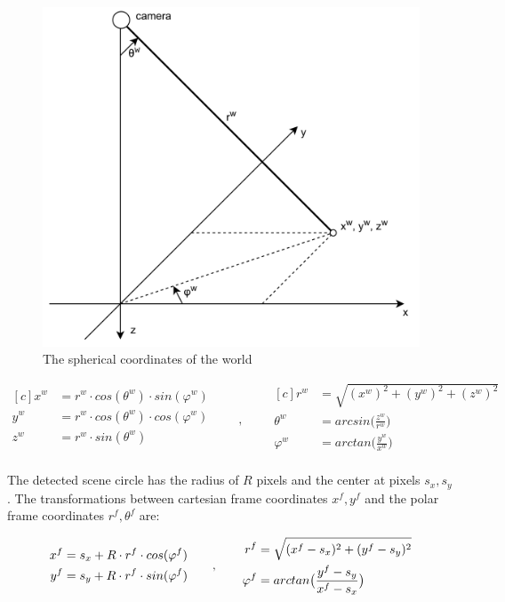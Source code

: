 \documentclass[a4paper,12pt,titlepage]{article}
\numberwithin{figure}{section}
\begin{document}
\begin{figure}[h]
\centering
\includegraphics[width=1\linewidth]{fig/sphere.png}
\caption{The spherical coordinates of the world}
\label{fig:sphere}
\end{figure}


\begin{equation*}
\begin{aligned}[c]
x^w &= r^w \cdot cos(\theta^w) \cdot sin(\varphi^w) \\
y^w &= r^w \cdot cos(\theta^w) \cdot cos(\varphi^w) \\
z^w &= r^w \cdot sin(\theta^w) \\
\end{aligned}
\qquad,\qquad
\begin{aligned}[c]
r^w &= \sqrt{(x^w)^2 + (y^w)^2 + (z^w)^2} \\
\theta^w &= arcsin\Big(\frac{z^w}{r^w}\Big) \\
\varphi^w &= arctan\Big(\frac{y^w}{x^w}\Big) \\
\end{aligned}
\end{equation*}



The detected scene circle has the radius of $R$ pixels and the center at pixels $s_x, s_y$. The transformations between cartesian frame coordinates $x^f, y^f$ and the polar frame coordinates $r^f, \theta^f$ are:

\begin{equation*}
\begin{aligned}[c]
x^f &= s_x + R \cdot r^f \cdot cos(\varphi^f) \\
y^f &= s_y + R \cdot r^f \cdot sin(\varphi^f) \\
\end{aligned}
\qquad,\qquad
\begin{aligned}[c]
r^f &= \sqrt{(x^f - s_x)^2 + (y^f - s_y)^2} \\
\varphi^f &= arctan\big{(}\frac{y^f - s_y}{x^f - s_x}\big{)}
\end{aligned}
\end{equation*}
\end{document}
